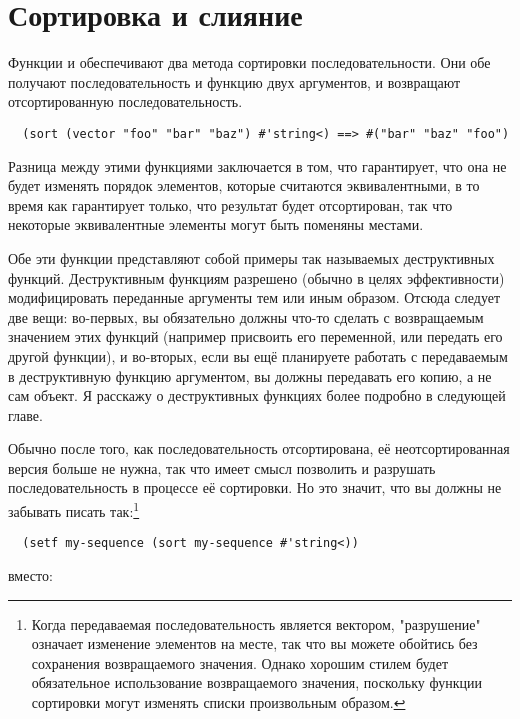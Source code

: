 \section{Сортировка и слияние}

Функции  и  обеспечивают два метода сортировки
последовательности.  Они обе получают последовательность и функцию двух аргументов, и
возвращают отсортированную последовательность.

\begin{verbatim}
  (sort (vector "foo" "bar" "baz") #'string<) ==> #("bar" "baz" "foo")
\end{verbatim}

Разница между этими функциями заключается в том, что  гарантирует, что
она не будет изменять порядок элементов, которые считаются эквивалентными, в то время как
 гарантирует только, что результат будет отсортирован, так что некоторые
эквивалентные элементы могут быть поменяны местами.

Обе эти функции представляют собой примеры так называемых деструктивных функций.  Деструктивным
функциям разрешено (обычно в целях эффективности) модифицировать переданные аргументы тем
или иным образом.  Отсюда следует две вещи: во-первых, вы обязательно должны что-то сделать с
возвращаемым значением этих функций (например присвоить его переменной, или передать его
другой функции), и во-вторых, если вы ещё планируете работать с передаваемым в
деструктивную функцию аргументом, вы должны передавать его копию, а не сам объект.
Я расскажу о деструктивных функциях более подробно в следующей главе.

Обычно после того, как последовательность отсортирована, её неотсортированная версия
больше не нужна, так что имеет смысл
позволить  и  разрушать последовательность в процессе её
сортировки.  Но это значит, что вы должны не забывать писать так:\footnote{Когда
  передаваемая последовательность является вектором, "разрушение" означает изменение
  элементов на месте, так что вы можете обойтись без сохранения возвращаемого значения.
  Однако хорошим стилем будет обязательное использование возвращаемого значения,
  поскольку функции сортировки могут изменять списки произвольным образом.}

\begin{verbatim}
  (setf my-sequence (sort my-sequence #'string<))
\end{verbatim}

вместо:

